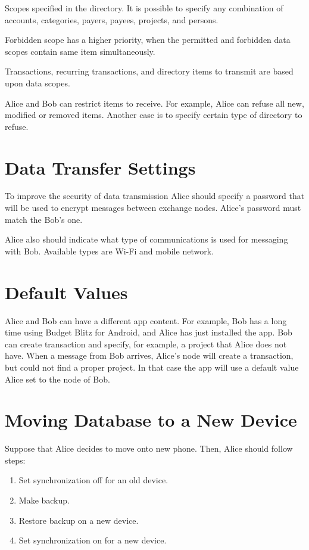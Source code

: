 \documentclass[a4paper,10pt,english]{sphinxmanual}
\begin{document}
Scopes specified in the  directory. It is possible to specify any combination of accounts,
categories, payers, payees, projects, and persons.

Forbidden scope has a higher priority, when the permitted and forbidden data scopes contain
same item simultaneously.

Transactions, recurring transactions, and directory items to transmit are based upon data scopes.

Alice and Bob can restrict items to receive. For example, Alice can refuse all new, modified
or removed items. Another case is to specify certain type of directory to refuse.


\section{Data Transfer Settings}
\label{\detokenize{teamwork:data-transfer-settings}}
To improve the security of data transmission Alice should specify a password that will
be used to encrypt messages between exchange nodes. Alice’s password must match the Bob’s one.

Alice also should indicate what type of communications is used for messaging with Bob.
Available types are Wi-Fi and mobile network.


\section{Default Values}
\label{\detokenize{teamwork:default-values}}
Alice and Bob can have a different app content. For example, Bob has a long time using Budget Blitz for Android,
and Alice has just installed the app. Bob can create transaction and specify, for example,
a project that Alice does not have. When a message from Bob arrives, Alice’s node will
create a transaction, but could not find a proper project. In that case the app will
use a default value Alice set to the node of Bob.


\section{Moving Database to a New Device}
\label{\detokenize{teamwork:moving-database-to-a-new-device}}
Suppose that Alice decides to move onto new phone. Then, Alice should follow steps:
\begin{enumerate}
\def\theenumi{\arabic{enumi}}
\def\labelenumi{\theenumi .}
\makeatletter\def\p@enumii{\p@enumi \theenumi .}\makeatother
\item {} 
Set synchronization off for an old device.

\item {} 
Make backup.

\item {} 
Restore backup on a new device.

\item {} 
Set synchronization on for a new device.

\end{enumerate}
\end{document}
